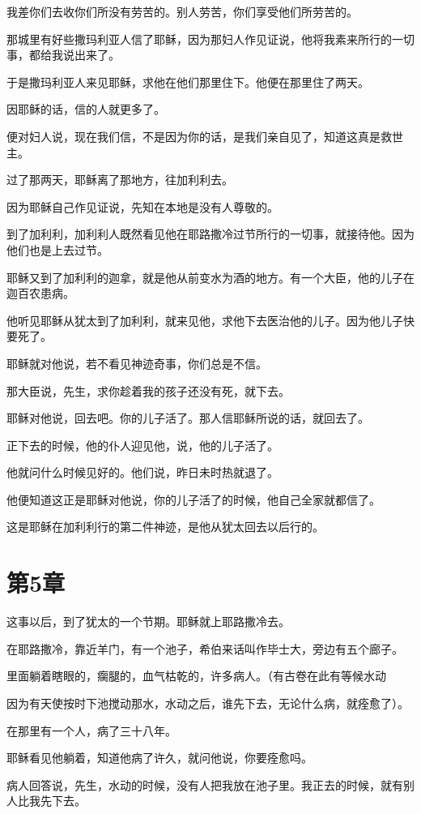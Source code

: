 \documentclass[12pt,oneside]{book}
\begin{document}
我差你们去收你们所没有劳苦的。别人劳苦，你们享受他们所劳苦的。

那城里有好些撒玛利亚人信了耶稣，因为那妇人作见证说，他将我素来所行的一切事，都给我说出来了。

于是撒玛利亚人来见耶稣，求他在他们那里住下。他便在那里住了两天。

因耶稣的话，信的人就更多了。

便对妇人说，现在我们信，不是因为你的话，是我们亲自见了，知道这真是救世主。

过了那两天，耶稣离了那地方，往加利利去。

因为耶稣自己作见证说，先知在本地是没有人尊敬的。

到了加利利，加利利人既然看见他在耶路撒冷过节所行的一切事，就接待他。因为他们也是上去过节。

耶稣又到了加利利的迦拿，就是他从前变水为酒的地方。有一个大臣，他的儿子在迦百农患病。

他听见耶稣从犹太到了加利利，就来见他，求他下去医治他的儿子。因为他儿子快要死了。

耶稣就对他说，若不看见神迹奇事，你们总是不信。

那大臣说，先生，求你趁着我的孩子还没有死，就下去。

耶稣对他说，回去吧。你的儿子活了。那人信耶稣所说的话，就回去了。

正下去的时候，他的仆人迎见他，说，他的儿子活了。

他就问什么时候见好的。他们说，昨日未时热就退了。

他便知道这正是耶稣对他说，你的儿子活了的时候，他自己全家就都信了。

这是耶稣在加利利行的第二件神迹，是他从犹太回去以后行的。

\chapter{第5章}
这事以后，到了犹太的一个节期。耶稣就上耶路撒冷去。

在耶路撒冷，靠近羊门，有一个池子，希伯来话叫作毕士大，旁边有五个廊子。

里面躺着瞎眼的，瘸腿的，血气枯乾的，许多病人。（有古卷在此有等候水动

因为有天使按时下池搅动那水，水动之后，谁先下去，无论什么病，就痊愈了）。

在那里有一个人，病了三十八年。

耶稣看见他躺着，知道他病了许久，就问他说，你要痊愈吗。

病人回答说，先生，水动的时候，没有人把我放在池子里。我正去的时候，就有别人比我先下去。
\end{document}
